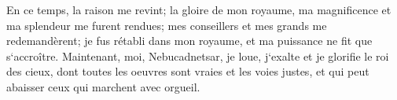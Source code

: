 \verse En ce temps, la raison me revint; la gloire de mon royaume, ma magnificence et ma splendeur me furent rendues; mes conseillers et mes grands me redemandèrent; je fus rétabli dans mon royaume, et ma puissance ne fit que s`accroître. 
\verse Maintenant, moi, Nebucadnetsar, je loue, j`exalte et je glorifie le roi des cieux, dont toutes les oeuvres sont vraies et les voies justes, et qui peut abaisser ceux qui marchent avec orgueil. 

\chapter{}

